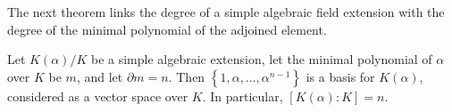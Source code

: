 

The next theorem links the degree of a simple algebraic field extension with the degree of the minimal polynomial of the adjoined element. 
\begin{theorem} \label{thm:degree-theorem}
    Let $K(\alpha) / K$ be a simple algebraic extension, let the minimal polynomial of $\alpha$ over $K$ be $m$, and let $\partial m=n$. Then $\left\{1, \alpha, \ldots, \alpha^{n-1}\right\}$ is a basis for $K(\alpha)$, considered as a vector space over $K$. In particular, \([K(\alpha):K]=n\). \label{algebraic case}
\end{theorem}

